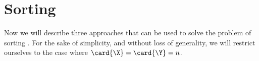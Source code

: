 \chapter{Sorting \XY}

Now we will describe three approaches that can be used to solve the problem
of sorting \XY. For the sake of simplicity, and without loss of generality,
we will restrict ourselves to the case where $\card{\X} = \card{\Y} = n$.
